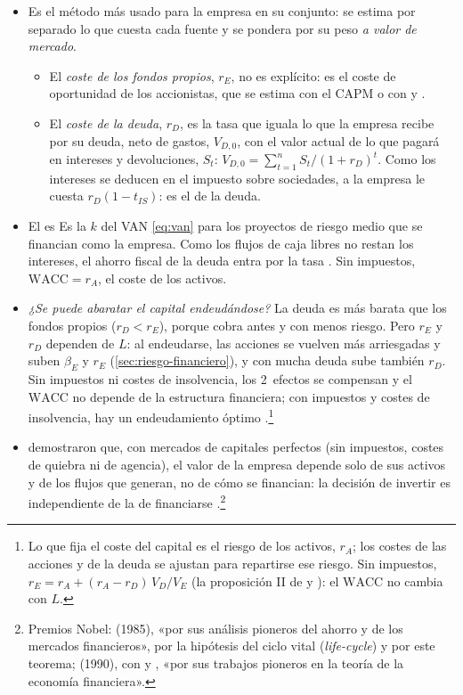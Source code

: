 \documentclass[11pt]{article}
\begin{document}
\begin{itemize}
\item Es el método más usado para la empresa en su conjunto: se estima por separado lo que cuesta cada fuente y se pondera por su peso \emph{a valor de mercado}.
  \begin{itemize}
  \item El \emph{coste de los fondos propios}, $r_E$, no es explícito: es el coste de oportunidad de los accionistas, que se estima con el CAPM o con  y .
  \item El \emph{coste de la deuda}, $r_D$, es la tasa que iguala lo que la empresa recibe por su deuda, neto de gastos, $V_{D,0}$, con el valor actual de lo que pagará en intereses y devoluciones, $S_t$: $V_{D,0}=\sum_{t=1}^{n}S_t/(1+r_D)^t$. Como los intereses se deducen en el impuesto sobre sociedades, a la empresa le cuesta $r_D(1-t_{IS})$: es el  de la deuda\nocite{ModiglianiMiller1963Corporate}.
  \end{itemize}
\item El  es
  Es la $k$ del VAN \eqref{eq:van} para los proyectos de riesgo medio que se financian como la empresa. Como los flujos de caja libres no restan los intereses, el ahorro fiscal de la deuda entra por la tasa . Sin impuestos, $\mathrm{WACC}=r_A$, el coste de los activos\nocite{ModiglianiMiller1958Cost}.
\item \emph{¿Se puede abaratar el capital endeudándose?} La deuda es más barata que los fondos propios ($r_D<r_E$), porque cobra antes y con menos riesgo. Pero $r_E$ y $r_D$ dependen de $L$: al endeudarse, las acciones se vuelven más arriesgadas y suben $\beta_E$ y $r_E$ (\ref{sec:riesgo-financiero}), y con mucha deuda sube también $r_D$. Sin impuestos ni costes de insolvencia, los 2~efectos se compensan y el $\mathrm{WACC}$ no depende de la estructura financiera; con impuestos y costes de insolvencia, hay un endeudamiento óptimo .\footnote{Lo que fija el coste del capital es el riesgo de los activos, $r_A$; los costes de las acciones y de la deuda se ajustan para repartirse ese riesgo. Sin impuestos, $r_E=r_A+(r_A-r_D)\,V_D/V_E$ (la proposición II de  y ): el $\mathrm{WACC}$ no cambia con $L$.}
\item \textcite{ModiglianiMiller1958Cost} demostraron que, con mercados de capitales perfectos (sin impuestos, costes de quiebra ni de agencia), el valor de la empresa depende solo de sus activos y de los flujos que generan, no de cómo se financian: la decisión de invertir es independiente de la de financiarse .\footnote{Premios Nobel:  (1985), «por sus análisis pioneros del ahorro y de los mercados financieros»\nocite{Nobel1985Modigliani}, por la hipótesis del ciclo vital (\emph{life-cycle}) y por este teorema;  (1990), con  y , «por sus trabajos pioneros en la teoría de la economía financiera»\nocite{Nobel1990Markowitz}.}

\end{itemize}
\end{document}
